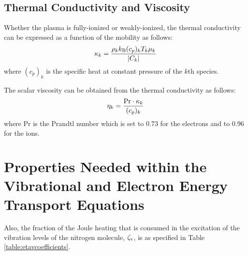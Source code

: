 \documentclass{warpdoc}
\begin{document}
\subsection{Thermal Conductivity and Viscosity}

Whether the plasma is fully-ionized or weakly-ionized, the thermal conductivity can be expressed as a function of the mobility as follows:
%
\begin{equation}
\kappa_k =     \frac{ \rho_k k_{\rm B}  (c_p)_k T_k \mu_k}{|C_k|} 
\end{equation}
%
where $(c_p)_k$ is the specific heat at constant pressure of the $k$th species.

The scalar viscosity can be obtained from the thermal conductivity as follows:
%
\begin{equation}
\eta_k = \frac{{\rm Pr} \cdot \kappa_k}{(c_p)_k}
\end{equation}
% 
where Pr is the Prandtl number which is set to 0.73 for the electrons and to 0.96 for the ions.



\section{Properties Needed within the Vibrational and Electron Energy Transport Equations}


Also, the fraction of the Joule heating that is consumed in the excitation of the vibration levels of the nitrogen molecule, $\zeta_{\rm v}$,  is as specified in Table \ref{table:etavcoefficients}.
\end{document}
